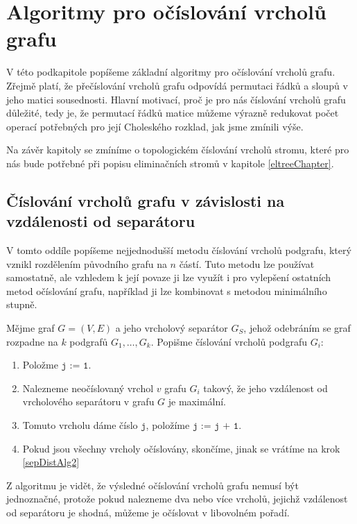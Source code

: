 \documentclass[11pt,american,czech,oneside]{book}
\theoremstyle{plain}
\theoremstyle{definition}
\begin{document}
\section{Algoritmy pro očíslování vrcholů grafu}
\label{Numbering}
V této podkapitole popíšeme základní algoritmy pro očíslování vrcholů grafu. Zřejmě platí, že přečíslování vrcholů grafu odpovídá permutaci řádků a sloupů v jeho matici sousednosti. Hlavní motivací, proč je pro nás číslování vrcholů grafu důležité, tedy je, že permutací řádků matice můžeme výrazně redukovat počet operací potřebných pro její Choleského rozklad, jak jsme zmínili výše.

Na závěr kapitoly se zmíníme o topologickém číslování vrcholů stromu, které pro nás bude potřebné při popisu eliminačních stromů v kapitole \ref{eltreeChapter}.

\subsection{Číslování vrcholů grafu v závislosti na vzdálenosti od separátoru}
\label{sepDistOrdering}

V tomto oddíle popíšeme nejjednodušší metodu číslování vrcholů podgrafu, který vznikl rozdělením původního grafu na $n$ částí.
Tuto metodu lze používat samostatně, ale vzhledem k její povaze ji lze využít i pro vylepšení ostatních metod očíslování grafu,
například ji lze kombinovat s metodou minimálního stupně.

Mějme graf $G = (V,E)$ a jeho vrcholový separátor $G_S$, jehož odebráním se graf rozpadne na $k$ podgrafů $G_1, \ldots, G_k$.
Popišme číslování vrcholů podgrafu $G_i$:

\begin{enumerate}
  \item Položme $\texttt{j := 1}$.
  \item \label{sepDistAlg2} Nalezneme neočíslovaný vrchol $v$ grafu $G_i$ takový, že jeho vzdálenost od vrcholového separátoru v grafu $G$ je maximální.
  \item Tomuto vrcholu dáme číslo $\texttt{j}$, položíme $\texttt{j := j + 1}$.
  \item Pokud jsou všechny vrcholy očíslovány, skončíme, jinak se vrátíme na krok \ref{sepDistAlg2}
\end{enumerate}

Z algoritmu je vidět, že výsledné očíslování vrcholů grafu nemusí být jednoznačné, protože pokud nalezneme dva nebo více vrcholů, jejichž vzdálenost od separátoru je shodná, můžeme je očíslovat v libovolném pořadí.
\end{document}
